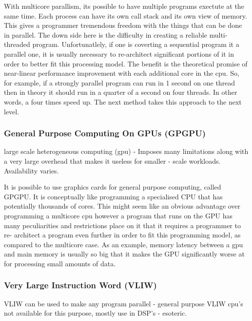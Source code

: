 \begin{roughwork}

	With multicore parallism, its possible to have multiple programs exectute at the
	same time. Each process can have its own call stack and its own view of memory.
	This gives a programmer tremendous freedom with the things that can be done in
	parallel. The down side here is the difficulty in creating a reliable multi-
	threaded program. Unfortunatlely, if one is coverting a sequential program it
	a parallel one, it is usually necessary to re-architect significant portions of
	it in order to better fit this processing model. The benefit is the theoretical
	promise of near-linear performance improvement with each additional core in the
	cpu. So, for example, if a strongly parallel program can run in 1 second on one
	thread then in theory it should run in a quarter of a second on four threads. In
	other words, a four times speed up. The next method takes this approach to the
	next level.

\end{roughwork}


\subsubsection{General Purpose Computing On GPUs (GPGPU)}
\begin{sectionplan}
     large scale heterogeneous computing (gpu) - Imposes many limitations along
with a very large overhead that makes it useless for smaller - scale workloads.
Availability varies.
\end{sectionplan}

\begin{roughwork}

	It is possible to use graphics cards for general purpose computing, called
	GPGPU. It is conceptually like programming a specialised CPU that has
	potentially thousands of cores. This might seem like an obvious advantage over
	programming a multicore cpu however a program that runs on the GPU has many
	peculiarities and restrictions place on it that it requires a programmer to re-
	architect a program even further in order to fit this programming model, as
	compared to the multicore case. As an example, memory latency between a gpu and
	main memory is usually so big that it makes the GPU significantly worse at for
	processing small amounts of data.

\end{roughwork}

\subsubsection{Very Large Instruction Word (VLIW)}
\begin{sectionplan}
     VLIW can be used to make any program parallel - general purpose VLIW cpu's
not available for this purpose, mostly use in DSP's - esoteric.
\end{sectionplan}


